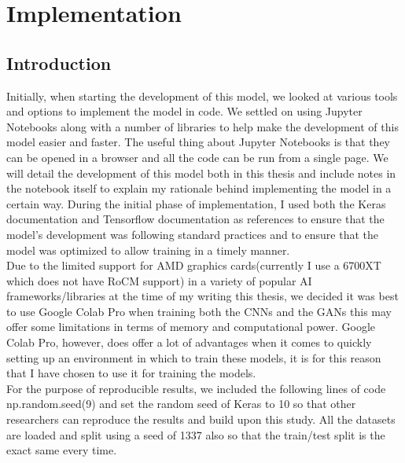 \chapter{Implementation}
\section{Introduction}
Initially, when starting the development of this model, we looked at various tools and options to implement the model in code.  We settled on using Jupyter Notebooks along with a number of libraries to help make the development of this model easier and faster.  The useful thing about Jupyter Notebooks is that they can be opened in a browser and all the code can be run from a single page.  We will detail the development of this model both in this thesis and include notes in the notebook itself to explain my rationale behind implementing the model in a certain way.  During the initial phase of implementation, I used both the Keras documentation \cite{keras} and Tensorflow documentation \cite{tensorflow} as references to ensure that the model's development was following standard practices and to ensure that the model was optimized to allow training in a timely manner. 
\\
Due to the limited support for AMD graphics cards(currently I use a 6700XT which does not have RoCM support\cite{amdLimitations}) in a variety of popular AI frameworks/libraries at the time of my writing this thesis, we decided it was best to use Google Colab Pro when training both the CNNs and the GANs this may offer some limitations in terms of memory and computational power.  Google Colab Pro, however, does offer a lot of advantages when it comes to quickly setting up an environment in which to train these models, it is for this reason that I have chosen to use it for training the models.
\\
For the purpose of reproducible results, we included the following lines of code np.random.seed(9) and set the random seed of Keras to 10 so that other researchers can reproduce the results and build upon this study.  All the datasets are loaded and split using a seed of 1337 also so that the train/test split is the exact same every time.
